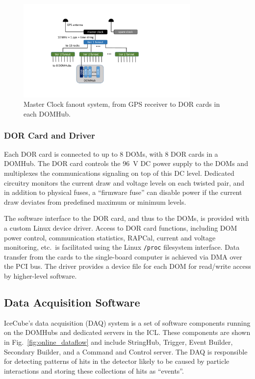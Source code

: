 \begin{figure}[!ht]
 \centering
 \includegraphics[width=0.8\textwidth]{graphics/online/data_readout/clock_fanout.pdf}
 \caption{Master Clock fanout system, from GPS receiver to DOR cards in
   each DOMHub.}
 \label{fig:clock_fanout}
\end{figure}


\subsubsection{DOR Card and Driver}

Each DOR card is connected to up to 8 DOMs, with 8 DOR cards in a
DOMHub. The DOR card controls the 96~V DC power supply to the DOMs and multiplexes the communications signaling on top of this DC level.
Dedicated circuitry monitors the current draw and voltage levels on each
twisted pair, and in addition to physical fuses, a ``firmware fuse'' can
disable power if the current draw deviates from predefined maximum or
minimum levels.

The software interface to the DOR card, and thus to the DOMs, is provided
with a custom Linux device driver.  Access to DOR card functions, including
DOM power control, communication statistics, RAPCal, current and voltage
monitoring, etc.~is facilitated using the Linux \texttt{/proc} filesystem
interface.  Data transfer from the cards to the single-board computer is
achieved via DMA over the PCI bus.  The driver provides a device file for
each DOM for read/write access by higher-level software.

\subsection{Data Acquisition Software}

IceCube's data acquisition (DAQ) system is a set of software components
running on the DOMHubs and dedicated servers in the ICL.  These components are shown in
Fig.~\ref{fig:online_dataflow} and include StringHub, Trigger, Event
Builder, Secondary Builder, and a Command and Control server.  The DAQ is
responsible for detecting patterns of hits in the detector likely to be
caused by particle interactions and storing these collections of hits as
``events''.

